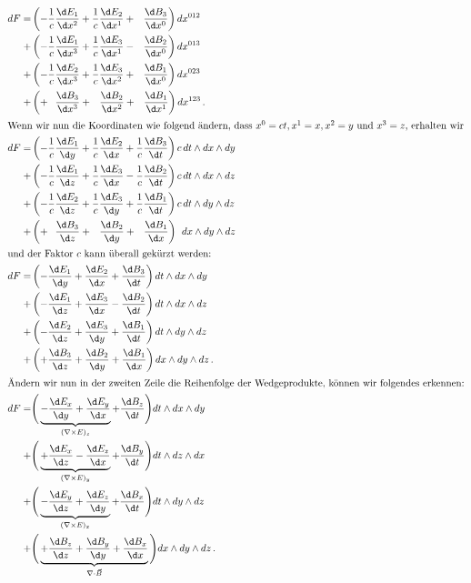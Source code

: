 \begin{align*}
	dF =
	&\left( - \frac{1}{c} \frac{\d E_1}{\d x^2} + \frac{1}{c} \frac{\d E_2}{\d x^1} + \phantom{\frac{1}{c}} \frac{\d B_3}{\d x^0} \right) dx^{012}
	\\
	+&\left( - \frac{1}{c} \frac{\d E_1}{\d x^3} + \frac{1}{c} \frac{\d E_3}{\d x^1} - \phantom{\frac{1}{c}} \frac{\d B_2}{\d x^0} \right) dx^{013}
	\\
	+&\left( - \frac{1}{c} \frac{\d E_2}{\d x^3} + \frac{1}{c} \frac{\d E_3}{\d x^2} + \phantom{\frac{1}{c}} \frac{\d B_1}{\d x^0} \right) dx^{023}
	\\
	+&\left( + \phantom{\frac{1}{c}} \frac{\d B_3}{\d x^3} + \phantom{\frac{1}{c}} \frac{\d B_2}{\d x^2} + \phantom{\frac{1}{c}} \frac{\d B_1}{\d x^1} \right) dx^{123} \, .
	\\
	\intertext{Wenn wir nun die Koordinaten wie folgend ändern, dass $x^0 = ct, x^1 = x, x^2 = y$ und $x^3 = z$, erhalten wir}
	dF =
	&\left( - \frac{1}{c} \frac{\d E_1}{\d y} + \frac{1}{c} \frac{\d E_2}{\d x} + \frac{1}{c} \frac{\d B_3}{\d t} \right) c \, dt \wedge dx \wedge dy
	\\
	+&\left( - \frac{1}{c} \frac{\d E_1}{\d z} + \frac{1}{c} \frac{\d E_3}{\d x} - \frac{1}{c} \frac{\d B_2}{\d t} \right) c \, dt \wedge dx \wedge dz
	\\
	+&\left( - \frac{1}{c} \frac{\d E_2}{\d z} + \frac{1}{c} \frac{\d E_3}{\d y} + \frac{1}{c} \frac{\d B_1}{\d t} \right) c\, dt \wedge dy \wedge dz
	\\
	+&\left( + \phantom{\frac{1}{c}} \frac{\d B_3}{\d z} + \phantom{\frac{1}{c}} \frac{\d B_2}{\d y} + \phantom{\frac{1}{c}} \frac{\d B_1}{\d x} \right) \phantom{c} dx \wedge dy \wedge dz
	\\
	\intertext{und der Faktor $c$ kann überall gekürzt werden:}
	dF =
	&\left( -  \frac{\d E_1}{\d y} +  \frac{\d E_2}{\d x} +  \frac{\d B_3}{\d t} \right) dt \wedge dx \wedge dy
	\\
	+&\left( -  \frac{\d E_1}{\d z} +  \frac{\d E_3}{\d x} -  \frac{\d B_2}{\d t} \right)dt \wedge dx \wedge dz
	\\
	+&\left( -  \frac{\d E_2}{\d z} +  \frac{\d E_3}{\d y} +  \frac{\d B_1}{\d t} \right)dt \wedge dy \wedge dz
	\\
	+&\left( +  \frac{\d B_3}{\d z} +  \frac{\d B_2}{\d y} +  \frac{\d B_1}{\d x} \right) dx \wedge dy \wedge dz \, .
	\\
	\intertext{Ändern wir nun in der zweiten Zeile die Reihenfolge der Wedgeprodukte, können wir folgendes erkennen:}
	dF =
	&\Bigg( \underbrace{ - \frac{\d E_x}{\d y} + \frac{\d E_y}{\d x}}_{(\nabla \times E)_z} + \frac{\d B_z}{\d t} \Bigg) dt \wedge dx \wedge dy
	\\
	+&\Bigg( \underbrace{ + \frac{\d E_x}{\d z} - \frac{\d E_z}{\d x}}_{(\nabla \times E)_y} + \frac{\d B_y}{\d t} \Bigg) dt \wedge dz \wedge dx
	\\
	+&\Bigg( \underbrace{ - \frac{\d E_y}{\d z} + \frac{\d E_z}{\d y}}_{(\nabla \times E)_x} + \frac{\d B_x}{\d t} \Bigg) dt \wedge dy \wedge dz
	\\
	+&\Bigg( \underbrace{ + \frac{\d B_z}{\d z} + \frac{\d B_y}{\d y} + \frac{\d B_x}{\d x}}_{\nabla \cdot \vec{B}} \Bigg) dx \wedge dy \wedge dz \, .
\end{align*}
